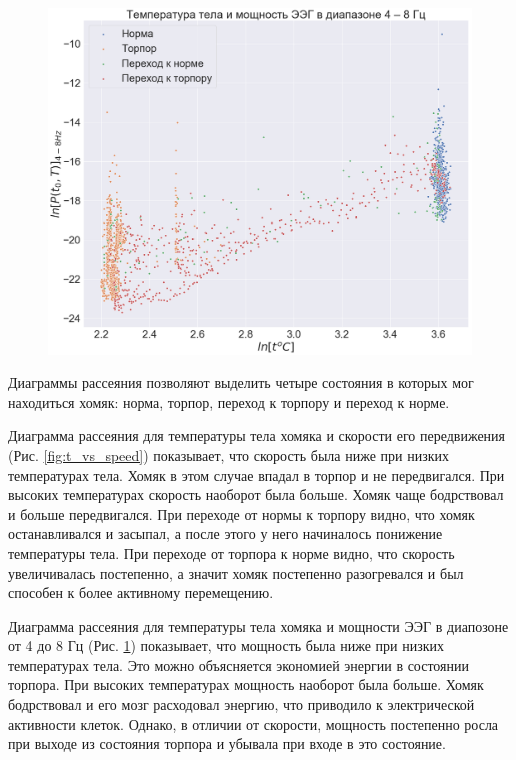 \documentclass[12pt,a4paper,oneside]{article}
\begin{document}
\begin{figure}[H]
\begin{minipage}{.5\textwidth}
  \includegraphics[width=\textwidth]{t_vs_p.png}
  \label{fig:t_vs_p}
\end{minipage}
\end{figure}

Диаграммы рассеяния позволяют выделить четыре состояния в которых мог находиться хомяк: норма, торпор, переход к торпору и переход к норме. 

Диаграмма рассеяния для температуры тела хомяка и скорости его передвижения (Рис. \ref{fig:t_vs_speed}) показывает, что скорость была ниже при низких температурах тела. Хомяк в этом случае впадал в торпор и не передвигался. При высоких температурах скорость наоборот была больше. Хомяк чаще бодрствовал и больше передвигался. При переходе от нормы к торпору видно, что хомяк останавливался и засыпал, а после этого у него начиналось понижение температуры тела. При переходе от торпора к норме видно, что скорость увеличивалась постепенно, а значит хомяк постепенно разогревался и был способен к более активному перемещению. 

Диаграмма рассеяния для температуры тела хомяка и мощности ЭЭГ в диапозоне от 4 до 8 Гц (Рис. \ref{fig:t_vs_p}) показывает, что мощность была ниже при низких температурах тела. Это можно объясняется экономией энергии в состоянии торпора. При высоких температурах мощность наоборот была больше. Хомяк бодрствовал и его мозг расходовал энергию, что приводило к электрической активности клеток. Однако, в отличии от скорости, мощность постепенно росла при выходе из состояния торпора и убывала при входе в это состояние. 
\end{document}
